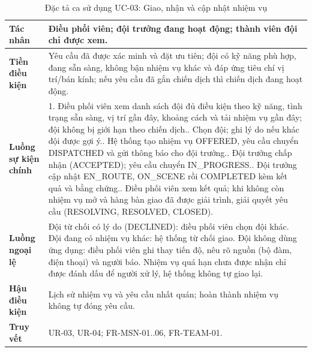\documentclass[12pt,a4paper,oneside]{report}
\begin{document}
\begin{table}[H]
  \centering
  \caption{Đặc tả ca sử dụng UC-03: Giao, nhận và cập nhật nhiệm vụ}\label{tab:uc03-spec}
  \small
  \begin{tabularx}{\textwidth}{|L{3.0cm}|Y|}
    \hline
    \textbf{Tác nhân} & Điều phối viên; đội trưởng đang hoạt động; thành viên đội chỉ được xem. \\
    \hline
    \textbf{Tiền điều kiện} & Yêu cầu đã được xác minh và đặt ưu tiên; đội có kỹ năng phù hợp, đang sẵn sàng, không bận nhiệm vụ khác và đáp ứng tiêu chí vị trí/bán kính; nếu yêu cầu đã gắn chiến dịch thì chiến dịch đang hoạt động. \\
    \hline
    \textbf{Luồng sự kiện chính} & 1. Điều phối viên xem danh sách đội đủ điều kiện theo kỹ năng, tình trạng sẵn sàng, vị trí gần đây, khoảng cách và tải nhiệm vụ gần đây; đội không bị giới hạn theo chiến dịch.. Chọn đội; ghi lý do nếu khác đội được gợi ý.. Hệ thống tạo nhiệm vụ OFFERED, yêu cầu chuyển DISPATCHED và gửi thông báo cho đội trưởng.. Đội trưởng chấp nhận (ACCEPTED); yêu cầu chuyển IN\_PROGRESS.. Đội trưởng cập nhật EN\_ROUTE, ON\_SCENE rồi COMPLETED kèm kết quả và bằng chứng.. Điều phối viên xem kết quả; khi không còn nhiệm vụ mở và hàng bàn giao đã được giải trình, giải quyết yêu cầu (RESOLVING, RESOLVED, CLOSED). \\
    \hline
    \textbf{Luồng ngoại lệ} & Đội từ chối có lý do (DECLINED): điều phối viên chọn đội khác. Đội đang có nhiệm vụ khác: hệ thống từ chối giao. Đội không dùng ứng dụng: điều phối viên ghi thay tiến độ, nêu rõ nguồn (bộ đàm, điện thoại) và người báo. Nhiệm vụ quá hạn chưa được nhận chỉ được đánh dấu để người xử lý, hệ thống không tự giao lại. \\
    \hline
    \textbf{Hậu điều kiện} & Lịch sử nhiệm vụ và yêu cầu nhất quán; hoàn thành nhiệm vụ không tự đóng yêu cầu. \\
    \hline
    \textbf{Truy vết} & UR-03, UR-04; FR-MSN-01..06, FR-TEAM-01. \\
    \hline
  \end{tabularx}
\end{table}
\end{document}
